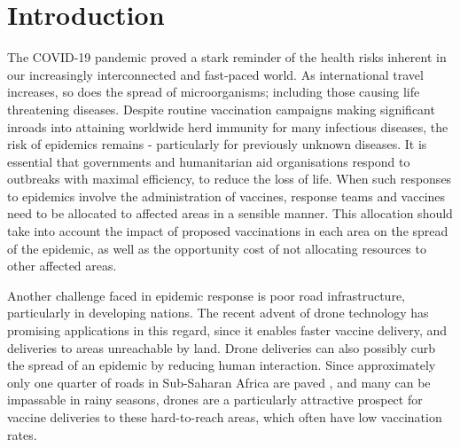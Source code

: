 \documentclass[10pt,letterpaper]{article}
\begin{document}
\linenumbers

\section*{Introduction}
The COVID-19 pandemic proved a stark reminder of the health risks inherent in our increasingly interconnected and fast-paced world. As international travel increases, so does the spread of microorganisms; including those causing life threatening diseases. Despite routine vaccination campaigns making significant inroads into attaining worldwide herd immunity for many infectious diseases, the risk of epidemics remains - particularly for previously unknown diseases. It is essential that governments and humanitarian aid organisations respond to outbreaks with maximal efficiency, to reduce the loss of life. When such responses to epidemics involve the administration of vaccines, response teams and vaccines need to be allocated to affected areas in a sensible manner. This allocation should take into account the impact of proposed vaccinations in each area on the spread of the epidemic, as well as the opportunity cost of not allocating resources to other affected areas.

Another challenge faced in epidemic response is poor road infrastructure, particularly in developing nations. The recent advent of drone technology has promising applications in this regard, since it enables faster vaccine delivery, and deliveries to areas unreachable by land. Drone deliveries can also possibly curb the spread of an epidemic by reducing human interaction. Since approximately only one quarter of roads in Sub-Saharan Africa are paved \cite{gwilliam2008burden}, and many can be impassable in rainy seasons, drones are a particularly attractive prospect for vaccine deliveries to these hard-to-reach areas, which often have low vaccination rates.
\end{document}
